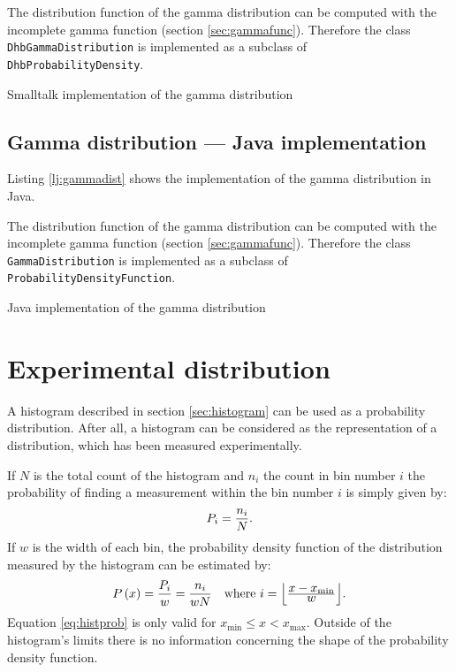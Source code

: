 \documentclass[twoside]{book}
\begin{document}
The distribution function of the gamma distribution can be
computed with the incomplete gamma function (\cf section
\ref{sec:gammafunc}). Therefore the class {\tt
DhbGammaDistribution} is implemented as a subclass of {\tt
DhbProbabilityDensity}.
\begin{listing} Smalltalk implementation of the gamma distribution \label{ls:gammadist}

\end{listing}

\subsection{Gamma distribution --- Java implementation}
\label{sec:jgammadist}  Listing \ref{lj:gammadist} shows the implementation of
the gamma distribution in Java.

The distribution function of the gamma distribution can be
computed with the incomplete gamma function (\cf section
\ref{sec:gammafunc}). Therefore the class {\tt GammaDistribution}
is implemented as a subclass of {\tt ProbabilityDensityFunction}.
\begin{listing} Java implementation of the gamma distribution \label{lj:gammadist}

\end{listing}

\section{Experimental distribution}
A histogram described in section \ref{sec:histogram} can be used
as a probability distribution. After all, a histogram can be
considered as the representation of a distribution, which has been
measured experimentally.

If $N$ is the total count of the histogram and $n_i$ the count in
bin number $i$ the probability of finding a measurement within the
bin number $i$ is simply given by:
\begin{equation}
  P_i={\displaystyle n_i \over\displaystyle N}.
\end{equation}
If $w$ is the width of each bin, the probability density function
of the distribution measured by the histogram can be estimated by:
\begin{equation}
\label{eq:histprob}
  P\left(x\right)={\displaystyle P_i \over\displaystyle w}
  ={\displaystyle n_i \over\displaystyle wN}\mbox{\quad
  where $i=\left\lfloor{\displaystyle x-x_{\min}\over\displaystyle w}\right\rfloor$.}
\end{equation}
Equation \ref{eq:histprob} is only valid for $x_{\min}\le x <
x_{\max}$. Outside of the histogram's limits there is no
information concerning the shape of the probability density
function.
\end{document}
